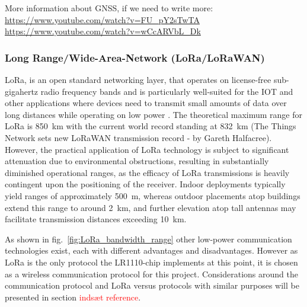 More information about \ac{GNSS}, if we need to write more:
\url{https://www.youtube.com/watch?v=FU_pY2sTwTA}
\url{https://www.youtube.com/watch?v=wCcARVbL_Dk}


\subsubsection{Long Range/Wide-Area-Network (LoRa/LoRaWAN)}
\ac{LoRa}, is an open standard networking layer, that operates on license-free sub-gigahertz radio frequency bands and is particularly well-suited for the \ac{IOT} and other applications where devices need to transmit small amounts of data over long distances while operating on low power \cite{LoRaWAN_1_0}.
The theoretical maximum range for LoRa is \SI{850}{\kilo\meter} with the current world record standing at \SI{832}{\kilo\meter} (The Things Network sets new \ac{LoRaWAN} transmission record - by Gareth Halfacree).
However, the practical application of \ac{LoRa} technology is subject to significant attenuation due to environmental obstructions, resulting in substantially diminished operational ranges, as the efficacy of \ac{LoRa} transmissions is heavily contingent upon the positioning of the receiver. Indoor deployments typically yield ranges of approximately \SI{500}{\meter}, whereas outdoor placements atop buildings extend this range to around \SI{2}{\kilo\meter}, and further elevation atop tall antennas may facilitate transmission distances exceeding \SI{10}{\kilo\meter}.

As shown in fig.~\ref{fig:LoRa_bandwidth_range} other low-power communication technologies exist, each with different advantages and disadvantages. However as \ac{LoRa} is the only protocol the LR1110-chip implements at this point, it is chosen as a wireless communication protocol for this project.
Considerations around the communication protocol and \ac{LoRa} versus protocols with similar purposes will be presented in section \textcolor{red}{indsæt reference}.

